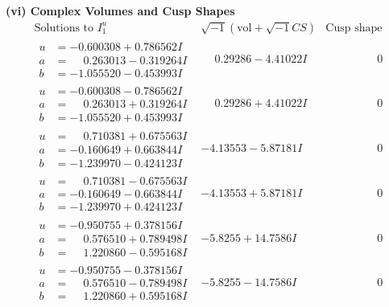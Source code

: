 \documentclass[1p]{elsarticle_modified}
\theoremstyle{definition}
\newcommand{\I}{\sqrt{-1}}
\begin{document}
\newpage\flushleft \textbf{(vi) Complex Volumes and Cusp Shapes}
$$\begin{array}{c|c|c}  
\text{Solutions to }I^u_{1}& \I (\text{vol} + \sqrt{-1}CS) & \text{Cusp shape}\\
 \hline 
\begin{aligned}
u &= -0.600308 + 0.786562 I \\
a &= \phantom{-}0.263013 - 0.319264 I \\
b &= -1.055520 - 0.453993 I\end{aligned}
 & \phantom{-}0.29286 - 4.41022 I & \phantom{-0.000000 } 0 \\ \hline\begin{aligned}
u &= -0.600308 - 0.786562 I \\
a &= \phantom{-}0.263013 + 0.319264 I \\
b &= -1.055520 + 0.453993 I\end{aligned}
 & \phantom{-}0.29286 + 4.41022 I & \phantom{-0.000000 } 0 \\ \hline\begin{aligned}
u &= \phantom{-}0.710381 + 0.675563 I \\
a &= -0.160649 + 0.663844 I \\
b &= -1.239970 - 0.424123 I\end{aligned}
 & -4.13553 - 5.87181 I & \phantom{-0.000000 } 0 \\ \hline\begin{aligned}
u &= \phantom{-}0.710381 - 0.675563 I \\
a &= -0.160649 - 0.663844 I \\
b &= -1.239970 + 0.424123 I\end{aligned}
 & -4.13553 + 5.87181 I & \phantom{-0.000000 } 0 \\ \hline\begin{aligned}
u &= -0.950755 + 0.378156 I \\
a &= \phantom{-}0.576510 + 0.789498 I \\
b &= \phantom{-}1.220860 - 0.595168 I\end{aligned}
 & -5.8255 + 14.7586 I & \phantom{-0.000000 } 0 \\ \hline\begin{aligned}
u &= -0.950755 - 0.378156 I \\
a &= \phantom{-}0.576510 - 0.789498 I \\
b &= \phantom{-}1.220860 + 0.595168 I\end{aligned}
 & -5.8255 - 14.7586 I & \phantom{-0.000000 } 0 \\ \hline\begin{aligned}

\end{aligned}
\end{array}$$
\end{document}
